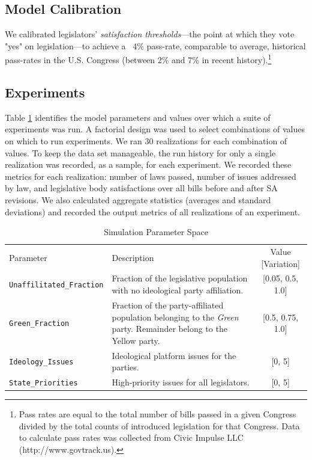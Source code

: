 \documentclass[pdftex,12pt]{llncs}
\begin{document}
\subsection{Model Calibration}
We calibrated legislators' \textit{satisfaction thresholds}---the point at which they vote "yes" on legislation---to achieve a ~4\% pass-rate, comparable to average, historical pass-rates in the U.S. Congress (between 2\% and 7\% in recent history).\footnote{Pass rates are equal to the total number of bills passed in a given Congress divided by the total counts of introduced legislation for that Congress. Data to calculate pass rates was collected from Civic Impulse LLC (http://www.govtrack.us).\label{passfn}}

\subsection{Experiments}
Table \ref{params} identifies the model parameters and values over which a suite of experiments was run.
A factorial design was used to select combinations of values on which to run experiments.
We ran 30 realizations for each combination of values.
To keep the data set manageable, the run history for only a single realization was recorded, as a sample, for each experiment.
We recorded these metrics for each realization:  number of laws passed, number of issues addressed by law, and legislative body satisfactions over all bills before and after SA revisions.
We also calculated aggregate statistics (averages and standard deviations) and recorded the output metrics of all realizations of an experiment.

\begin{table}
 \caption{Simulation Parameter Space}
 \begin{tabular}{lp{2.25in}c}
 \hline\noalign{\smallskip}
 Parameter & Description & Value [Variation] \\
 \noalign{\smallskip}
 \hline
 \noalign{\smallskip}
 \texttt{Unaffilitated\_Fraction} & Fraction of the legislative population with no ideological party  affiliation. & [0.05, 0.5, 1.0] \\
 \texttt{Green\_Fraction} & Fraction of the party-affiliated population belonging to the \textit{Green} party. Remainder belong to the Yellow party. & [0.5, 0.75, 1.0] \\
 \texttt{Ideology\_Issues} & Ideological platform issues for the parties. & [0, 5] \\
 \texttt{State\_Priorities} & High-priority issues for all legislators. & [0, 5] \\
 \hline
 \end{tabular}
 \label{params}
\end{table}
\end{document}
